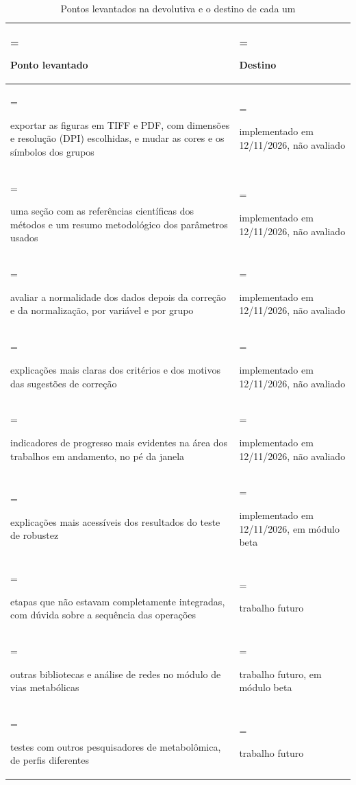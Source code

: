 \begin{table}[htbp]
\centering
\caption{Pontos levantados na devolutiva e o destino de cada um}\label{tab:5-9}
\normalsize
\begin{tabularx}{\linewidth}{|>{\hsize=1.28\hsize\linewidth=\hsize\raggedright\arraybackslash\hspace{0pt}}X|>{\hsize=0.72\hsize\linewidth=\hsize\raggedright\arraybackslash\hspace{0pt}}X|}
\hline
\textbf{Ponto levantado} & \textbf{Destino} \\
\hline
exportar as figuras em TIFF e PDF, com dimensões e resolução (DPI) escolhidas, e mudar as cores e os símbolos dos grupos & implementado em 12/11/2026, não avaliado \\ \hline
uma seção com as referências científicas dos métodos e um resumo metodológico dos parâmetros usados & implementado em 12/11/2026, não avaliado \\ \hline
avaliar a normalidade dos dados depois da correção e da normalização, por variável e por grupo & implementado em 12/11/2026, não avaliado \\ \hline
explicações mais claras dos critérios e dos motivos das sugestões de correção & implementado em 12/11/2026, não avaliado \\ \hline
indicadores de progresso mais evidentes na área dos trabalhos em andamento, no pé da janela & implementado em 12/11/2026, não avaliado \\ \hline
explicações mais acessíveis dos resultados do teste de robustez & implementado em 12/11/2026, em módulo beta \\ \hline
etapas que não estavam completamente integradas, com dúvida sobre a sequência das operações & trabalho futuro \\ \hline
outras bibliotecas e análise de redes no módulo de vias metabólicas & trabalho futuro, em módulo beta \\ \hline
testes com outros pesquisadores de metabolômica, de perfis diferentes & trabalho futuro \\ \hline
\end{tabularx}
\end{table}


